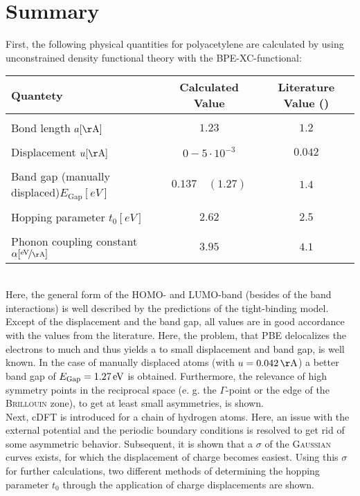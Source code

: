 \chapter{Summary}
First, the following physical quantities for polyacetylene are calculated by using unconstrained density functional theory with the BPE-XC-functional:
\begin{table}[!h]
	\centering
	\begin{tabular}{l|c|c}
		Quantety & Calculated Value & Literature Value (\cite{PhysRevLett.42.1698, doi:10.1021/cr990357p})\\
		\hline \hline
		&&\\[-.3cm]
		Bond length \hfill$a [\unit{\AA}]$ & $1.23$ & $1.2$\\ \hline&&\\[-.3cm]
		Displacement \hfill$u [\unit{\AA}]$& $0 - 5\cdot10^{-3}$ & $0.042$\\ \hline&&\\[-.3cm]
		Band gap (manually displaced)\hfill$E_\text{Gap} [\unit{eV}]$ & $0.137\quad(1.27)$ & $1.4$\\ \hline &&\\[-.3cm]
		Hopping parameter \hfill$t_0 [\unit{eV}]$ & $2.62$ & $2.5$ \\ \hline&&\\[-.3cm]
		Phonon coupling constant \hspace*{2cm}$\alpha [\unitfrac{eV}{\AA}]$& $3.95$ & $4.1$
	\end{tabular}
\end{table}\\
Here, the general form of the HOMO- and LUMO-band (besides of the band interactions) is well described by the predictions of the tight-binding model. Except of the displacement and the band gap, all values are in good accordance with the values from the literature. Here, the problem, that PBE delocalizes the electrons to much and thus yields a to small displacement and band gap, is well known. In the case of manually displaced atoms (with $u = \unit[0.042]{\AA}$) a better band gap of $E_\text{Gap} = \unit[1.27]{eV}$ is obtained. Furthermore, the relevance of high symmetry points in the reciprocal space (e. g. the $\Gamma$-point or the edge of the \textsc{Brillouin} zone), to get at least small asymmetries, is shown.\\
Next, cDFT is introduced for a chain of hydrogen atoms. Here, an issue with the external potential and the periodic boundary conditions is resolved to get rid of some asymmetric behavior. Subsequent, it is shown that a $\sigma$ of the \textsc{Gaussian} curves exists, for which the displacement of charge becomes easiest. Using this $\sigma$ for further calculations, two different methods of determining the hopping parameter $t_0$ through the application of charge displacements are shown.\\
